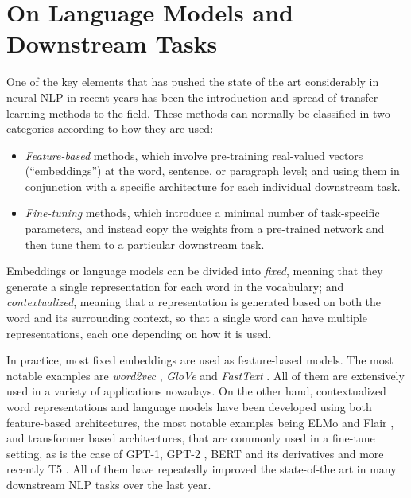 \chapter{On Language Models and Downstream Tasks}

One of the key elements that has pushed the state of the art considerably in neural NLP in recent years has been the introduction and spread of transfer learning methods to the field. These methods can normally be classified in two categories according to how they are used:
\begin{itemize}
    \item \emph{Feature-based} methods, which involve pre-training real-valued vectors (``embeddings'') at the word, sentence, or paragraph level; and using them in conjunction with a specific architecture for each individual downstream task.
    \item \emph{Fine-tuning} methods, which introduce a minimal number of task-specific parameters, and instead copy the weights from a pre-trained network and then tune them to a particular downstream task.
\end{itemize}
Embeddings or language models can be divided into \emph{fixed}, meaning that they generate a single representation for each word in the vocabulary; and \emph{contextualized}, meaning that a representation is generated based on both the word and its surrounding context, so that a single word can have multiple representations, each one depending on how it is used.

In practice, most fixed embeddings are used as feature-based models. The most notable examples are \emph{word2vec} \citep{mikolov-etal-2013-distributed}, \emph{GloVe} \citep{pennington-etal-2014-glove} and \emph{FastText} \citep{mikolov-etal-2018-advances}. All of them are extensively used in a variety of applications nowadays. On the other hand, contextualized word representations and language models have been developed using both feature-based architectures, the most notable examples being ELMo and Flair \citep{peters-etal-2018-deep,akbik-etal-2018-contextual}, and transformer based architectures, that are commonly used in a fine-tune setting, as is the case of GPT-1, GPT-2 \citep{radford-etal-2018-improving,radford-etal-2019-language}, BERT and its derivatives \citep{devlin-etal-2019-bert,liu-etal-2019-roberta,lan-etal-2020-albert} and more recently T5 \citep{raffel-etal-2020-exploring}. All of them have repeatedly improved the state-of-the art in many downstream NLP tasks over the last year.

